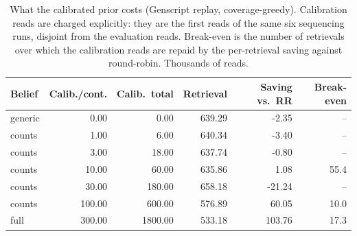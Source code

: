 \begin{table}[!t]
\centering
\caption{What the calibrated prior costs (Genscript replay, coverage-greedy).  Calibration reads are charged explicitly: they are the first reads of the same six sequencing runs, disjoint from the evaluation reads.  Break-even is the number of retrievals over which the calibration reads are repaid by the per-retrieval saving against round-robin.  Thousands of reads.}
\label{tab:r4calcost}
\scriptsize
\setlength{\tabcolsep}{3pt}
\begin{tabular}{@{}lrrrrr@{}}
\toprule
Belief & Calib./cont. & Calib.\ total & Retrieval & Saving vs.\ RR & Break-even \\
\midrule
generic & 0.00 & 0.00 & 639.29 & -2.35 & -- \\
counts & 1.00 & 6.00 & 640.34 & -3.40 & -- \\
counts & 3.00 & 18.00 & 637.74 & -0.80 & -- \\
counts & 10.00 & 60.00 & 635.86 & 1.08 & 55.4 \\
counts & 30.00 & 180.00 & 658.18 & -21.24 & -- \\
counts & 100.00 & 600.00 & 576.89 & 60.05 & 10.0 \\
full & 300.00 & 1800.00 & 533.18 & 103.76 & 17.3 \\
\bottomrule
\end{tabular}
\end{table}
